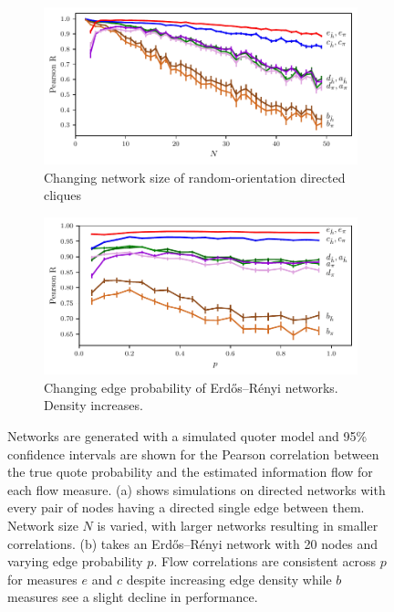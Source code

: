\begin{figure}[!htbp]
	\centering
	\begin{subfigure}[t]{\textwidth}
		\centering
		\includegraphics{chapter3/figs/zipf_network_size.pdf}
		\caption{Changing network size of random-orientation directed cliques}
		\label{fig:flow_networksize}
	\end{subfigure}

	\begin{subfigure}[t]{\textwidth}
		\centering
		\includegraphics{chapter3/figs/zipf_ER.pdf}
		\caption{Changing edge probability of Erdős–Rényi networks. Density increases.}
		\label{fig:flow_ERchange}
	\end{subfigure}
	\caption{Networks are generated with a simulated quoter model and 95\% confidence intervals are shown for the Pearson correlation between the true quote probability and the estimated information flow for each flow measure. (a) shows simulations on directed networks with every pair of nodes having a directed single edge between them. Network size $N$ is varied, with larger networks resulting in smaller correlations. (b) takes an Erdős–Rényi network with 20 nodes and varying edge probability $p$. Flow correlations are consistent across $p$ for measures $e$ and $c$ despite increasing edge density while $b$ measures see a slight decline in performance. \label{fig:flow_sizeandER}}
\end{figure}


